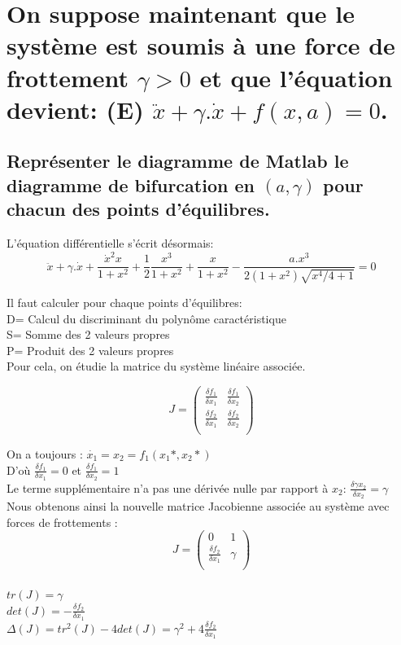 \documentclass[10pt,a4paper]{article}
\begin{document}
\section{On suppose maintenant que le système est soumis à une force de frottement $\gamma > 0$ et que l'équation devient: (E) $\ddot{x} + \gamma.\dot{x} + f(x,a) = 0$.}
\subsection{Représenter le diagramme de Matlab le diagramme de bifurcation  en $(a,\gamma)$ pour chacun des points d'équilibres.}
L'équation différentielle s'écrit désormais:\\
\[  \ddot{x} + \gamma.\dot{x} + \frac{\dot{x}^2x}{1+x^2} + \frac{1}{2}\frac{x^3}{1+x^2} + \frac{x}{1+x^2} - \frac{a.x^3}{2(1+x^2)\sqrt{x^4/4+1}}=0 \]	

Il faut calculer pour chaque points d'équilibres:\\
D= Calcul du discriminant du polynôme caractéristique\\
S= Somme des 2 valeurs propres\\
P= Produit des 2 valeurs propres \\

Pour cela, on étudie la matrice du système linéaire associée.

\[
J=
\begin{pmatrix}
\frac{\delta f_1}{\delta x_1} & \frac{\delta f_1}{\delta x_2}\\
\frac{\delta f_2}{\delta x_1} & \frac{\delta f_2}{\delta x_2} \\
\end{pmatrix}
\]

On a toujours : $\dot{x_1}=x_2=f_1(x_1*,x_2*)$\\
D'où $\frac{\delta f_1}{\delta x_1}=0$ et $\frac{\delta f_1}{\delta x_2}=1$\\
Le terme supplémentaire n'a pas une dérivée nulle par rapport à $x_2$: $\frac{\delta \gamma x_2}{\delta x_2}=\gamma$\\
Nous obtenons ainsi la nouvelle matrice Jacobienne associée au système avec forces de frottements :
\[
J=
\begin{pmatrix}
0 & 1\\
\frac{\delta f_2}{\delta x_1} & \gamma\\
\end{pmatrix}
\]
\\
$tr(J) = \gamma $\\
$det(J) = -\frac{\delta f_2}{\delta x_1} $\\
$\Delta(J) = tr^2(J)-4det(J)=\gamma^2 + 4\frac{\delta f_2}{\delta x_1}$\\ 
\end{document}
